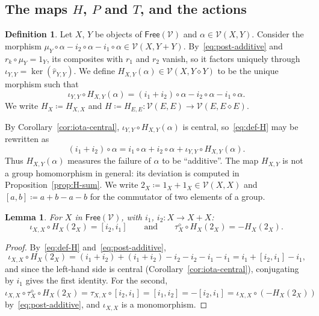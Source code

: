 \documentclass[reqno,a4paper]{amsart}
\theoremstyle{plain}
\newtheorem{lemma}[subsection]{Lemma}
\theoremstyle{definition}
\newtheorem{definition}[subsection]{Definition}
\newcommand{\DefEq}{\coloneq}
\newcommand{\V}{\ensuremath{\mathcal{V}}}
\newcommand{\Free}{\ensuremath{\mathsf{Free}}}
\newcommand{\cosmash}{\ensuremath{\diamond}}
\newcommand{\cm}[2]{\ensuremath{\hat{r}_{#1,#2}}}          %
\newcommand{\tw}[2]{\ensuremath{\tau_{#1,#2}}}             %
\newcommand{\swc}[1]{\ensuremath{\tau^{\cosmash}_{#1}}}          %
\begin{document}
\subsection{The maps \texorpdfstring{\(H\)}{H}, \texorpdfstring{\(P\)}{P} and \texorpdfstring{\(T\)}{T}, and the actions}\label{sec:HPT}

\begin{definition}\label{def:H}
  Let \(X\), \(Y\) be objects of \(\Free(\V)\) and \(\alpha\in\V(X,Y)\). Consider the morphism \(\mu_{Y}\circ\alpha-i_{2}\circ\alpha-i_{1}\circ\alpha\in\V(X,Y+Y)\). By~\eqref{eq:post-additive} and \(r_{k}\circ\mu_{Y}=1_{Y}\), its composites with \(r_{1}\) and \(r_{2}\) vanish, so it factors uniquely through \(\iota_{Y,Y}=\ker(\cm{Y}{Y})\). We define \(H_{X,Y}(\alpha)\in\V(X,Y\cosmash Y)\) to be the unique morphism such that
  \begin{equation}\label{eq:def-H}
    \iota_{Y,Y}\circ H_{X,Y}(\alpha)=(i_{1}+i_{2})\circ\alpha-i_{2}\circ\alpha-i_{1}\circ\alpha\text{.}
  \end{equation}
  We write \(H_{X}\DefEq H_{X,X}\) and \(H\DefEq H_{E,E}\colon \V(E,E)\to\V(E,E\cosmash E)\).
\end{definition}

By Corollary~\ref{cor:iota-central}, \(\iota_{Y,Y}\circ H_{X,Y}(\alpha)\) is central, so~\eqref{eq:def-H} may be rewritten as
\begin{equation}\label{eq:def-H-bis}
  (i_{1}+i_{2})\circ\alpha=i_{1}\circ\alpha+i_{2}\circ\alpha+\iota_{Y,Y}\circ H_{X,Y}(\alpha)\text{.}
\end{equation}
Thus \(H_{X,Y}(\alpha)\) measures the failure of \(\alpha\) to be ``additive''. The map \(H_{X,Y}\) is not a group homomorphism in general: its deviation is computed in Proposition~\ref{prop:H-sum}. We write \(2_{X}\DefEq 1_{X}+1_{X}\in\V(X,X)\) and \([a,b]\DefEq a+b-a-b\) for the commutator of two elements of a group.

\begin{lemma}\label{lem:H2}
  For \(X\) in \(\Free(\V)\), with \(i_{1}\), \(i_{2}\colon X\to X+X\):
  \[
    \iota_{X,X}\circ H_{X}(2_{X})=[i_{2},i_{1}]\qquad\text{and}\qquad\swc{X}\circ H_{X}(2_{X})=-H_{X}(2_{X})\text{.}
  \]
\end{lemma}

\begin{proof}
  By~\eqref{eq:def-H} and~\eqref{eq:post-additive},
  \[
    \iota_{X,X}\circ H_{X}(2_{X})=(i_{1}+i_{2})+(i_{1}+i_{2})-i_{2}-i_{2}-i_{1}-i_{1}=i_{1}+[i_{2},i_{1}]-i_{1}\text{,}
  \]
  and since the left-hand side is central (Corollary~\ref{cor:iota-central}), conjugating by \(i_{1}\) gives the first identity. For the second, \(\iota_{X,X}\circ\swc{X}\circ H_{X}(2_{X})=\tw{X}{X}\circ[i_{2},i_{1}]=[i_{1},i_{2}]=-[i_{2},i_{1}]=\iota_{X,X}\circ(-H_{X}(2_{X}))\) by~\eqref{eq:post-additive}, and \(\iota_{X,X}\) is a monomorphism.
\end{proof}
\end{document}
